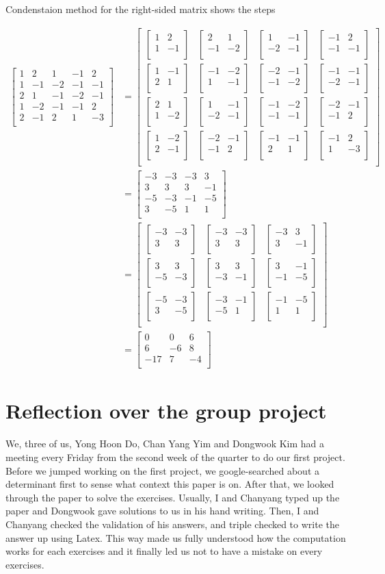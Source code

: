 \documentclass[12pt]{article}
\newcommand{\matxx}[2] {
\begin{bmatrix}
  #1 \\
  #2 \\
\end{bmatrix}
}
\newcommand{\matxxx}[3] {
\begin{bmatrix}
  #1 \\
  #2 \\
  #3 \\
\end{bmatrix}
}
\newcommand{\matxxxx}[4] {
\begin{bmatrix}
  #1 \\
  #2 \\
  #3 \\
  #4 \\
\end{bmatrix}
}
\newcommand{\matxxxxx}[5] {
\begin{bmatrix}
  #1 \\
  #2 \\
  #3 \\
  #4 \\
  #5 \\
\end{bmatrix}
}
\begin{document}
Condenstaion method for the right-sided matrix shows the steps

\[
  \begin{split}
    \matxxxxx
    {1 &  2 & 1 &  -1 &  2}
    {1 & -1 & -2 & -1 & -1}
    {2 &  1 & -1 & -2 & -1}
    {1 & -2 & -1 & -1 &  2}
    {2 & -1 &  2 &  1 & -3}
    & = \matxxxx
    {
      \matxx{1 & 2}{1 & -1} &
      \matxx{2 & 1}{-1 & -2} &
      \matxx{1 & -1}{-2 & -1} &
      \matxx{-1 & 2}{-1 & -1}
    }
    {
      \matxx{1 & -1}{2 & 1} &
      \matxx{-1 & -2}{1 & -1} &
      \matxx{-2 & -1}{-1 & -2} &
      \matxx{-1 & -1}{-2 & -1}
    }
    {
      \matxx{2 & 1}{1 & -2} &
      \matxx{1 & -1}{-2 & -1} &
      \matxx{-1 & -2}{-1 & -1} &
      \matxx{-2 & -1}{-1 & 2}
    }
    {
      \matxx{1 & -2}{2 & -1} &
      \matxx{-2 & -1}{-1 & 2} &
      \matxx{-1 & -1}{2 & 1} &
      \matxx{-1 & 2}{1 & -3}
    } \\
    & = \matxxxx
    {-3 & -3 & -3 &  3}
    {3 &  3 &  3 & -1}
    {-5 & -3 & -1 & -5}
    {3 & -5 &  1 &  1} \\
    & = \matxxx
    {
      \matxx{-3 & -3}{3 & 3} &
      \matxx{-3 & -3}{3 & 3} &
      \matxx{-3 & 3}{3 & -1}
    }
    {
      \matxx{3 & 3}{-5 & -3} &
      \matxx{3 & 3}{-3 & -1} &
      \matxx{3 & -1}{-1 & -5}
    }
    {
      \matxx{-5 & -3}{3 & -5} &
      \matxx{-3 & -1}{-5 & 1} &
      \matxx{-1 & -5}{1 & 1}
    } \\
    & = \matxxx{0 & 0 & 6}{6 & -6 & 8}{-17 & 7 & -4}
  \end{split}
\]

\pagebreak

\section{Reflection over the group project}

We, three of us, Yong Hoon Do, Chan Yang Yim and Dongwook Kim had a meeting every Friday from the second week of the quarter to do our first project. Before we jumped working on the first project, we google-searched about a determinant first to sense what context this paper is on. After that, we looked through the paper to solve the exercises. Usually, I and Chanyang typed up the paper and Dongwook gave solutions to us in his hand writing. Then, I and Chanyang checked the validation of his answers, and triple checked to write the answer up using Latex. This way made us fully understood how the computation works for each exercises and it finally led us not to have a mistake on every exercises.
\end{document}
